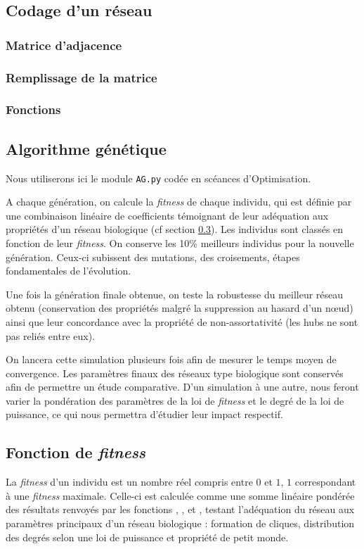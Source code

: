 \subsection{Codage d'un réseau}
\subsubsection{Matrice d'adjacence}
\subsubsection{Remplissage de la matrice}
\subsubsection{Fonctions}

\subsection{Algorithme génétique}
Nous utiliserons ici le module \texttt{AG.py} codée en scéances d'Optimisation. 

A chaque génération, on calcule la \textit{fitness} de chaque individu, qui est définie par une combinaison linéaire de coefficients témoignant de leur adéquation aux propriétés d'un réseau biologique (cf section \ref{fitness}).
Les individus sont classés en fonction de leur \textit{fitness}. On conserve les 10\% meilleurs individus pour la nouvelle génération. Ceux-ci subissent des mutations, des croisements, étapes fondamentales de l'évolution.

Une fois la génération finale obtenue, on teste la robustesse du meilleur réseau obtenu (conservation des propriétés malgré la suppression au hasard d'un nœud) ainsi que leur concordance avec la propriété de non-assortativité (les hubs ne sont pas reliés entre eux).

On lancera cette simulation plusieurs fois afin de mesurer le temps moyen de convergence.
Les paramètres finaux des réseaux type \og biologique \fg sont conservés afin de permettre un étude comparative. D'un simulation à une autre, nous feront varier la pondération des paramètres de la loi de \textit{fitness} et le degré de la loi de puissance, ce qui nous permettra d'étudier leur impact respectif.

\subsection{Fonction de \textit{fitness} }
\label{fitness}
La \textit{fitness} d'un individu est un nombre réel compris entre $0$ et $1$, $1$ correspondant à une \textit{fitness} maximale.
Celle-ci est calculée comme une somme linéaire pondérée des résultats renvoyés par les fonctions \texttt{}, \texttt{}, et \texttt{}, testant l'adéquation du réseau aux paramètres principaux d'un réseau biologique : formation de cliques, distribution des degrés selon une loi de puissance et propriété de petit monde.

